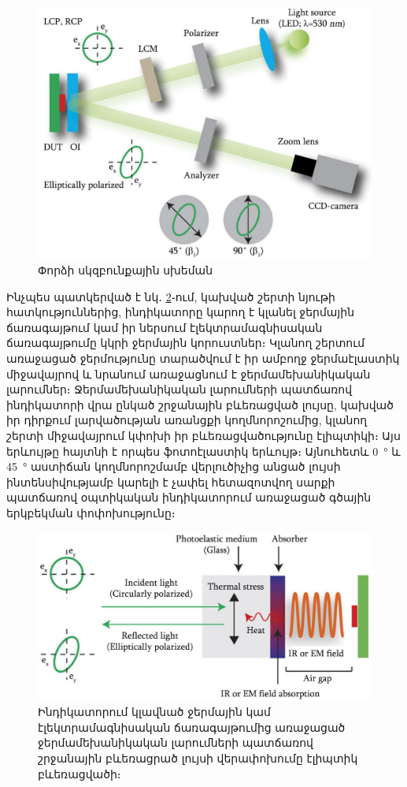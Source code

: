 \documentclass[12pt, fleqn]{report}
\begin{document}
\begin{figure}
    \centering
    \includegraphics[width=1.0\textwidth]{data/TEOIM/0.jpg}
    \caption{Փորձի սկզբունքային սխեման}
    \label{fig:TEOIM-scheme}
\end{figure}
Ինչպես պատկերված է նկ․ \ref{fig:TEOIM-photoelasticity}֊ում, կախված շերտի նյութի հատկություններից, ինդիկատորը կարող է կլանել ջերմային ճառագայթում կամ իր ներսում էլեկտրամագնիսական ճառագայթումը կկրի ջերմային կորուստներ։ Կլանող շերտում առաջացած ջերմությունը տարածվում է իր ամբողջ ջերմաէլաստիկ միջավայրով և նրանում առաջացնում է ջերմամեխանիկական լարումներ։ Ջերմամեխանիկական լարումների պատճառով ինդիկատորի վրա ընկած շրջանային բևեռացված լույսը, կախված իր դիրքում լարվածության առանցքի կողմնորոշումից, կլանող շերտի միջավայրում կփոխի իր բևեռացվածությունը էլիպտիկի։ Այս երևույթը հայտնի է որպես ֆոտոէլաստիկ երևույթ։ Այնուհետև \SI{0}{\degree} և \SI{45}{\degree} աստիճան կողմնորոշմամբ վերլուծիչից անցած լույսի ինտենսիվությամբ կարելի է չափել հետազոտվող սարքի պատճառով օպտիկական ինդիկատորում առաջացած գծային երկբեկման փոփոխությունը։

\begin{figure}
    \centering
    \includegraphics[width=1.0\textwidth]{data/TEOIM/1.jpg}
    \caption{Ինդիկատորում կլավնած ջերմային կամ էլեկտրամագնիսական ճառագայթումից առաջացած ջերմամեխանիկական լարումների պատճառով շրջանային բևեռացրած լույսի վերափոխումը էլիպտիկ բևեռացվածի։}
    \label{fig:TEOIM-photoelasticity}
\end{figure}
\end{document}
